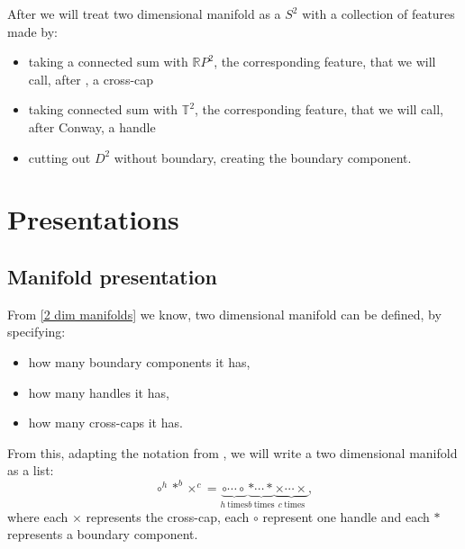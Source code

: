 After \cite{Conway2016} we will treat two dimensional manifold as a $S^2$ with 
a collection of features
made by:
\begin{itemize}
\item taking a connected sum with $\mathbb{R}P^2$, the corresponding feature, that
we will call, after \cite{Conway2016}, a cross-cap
\item taking connected sum with $\mathbb{T}^2$, the corresponding feature, that we will call, 
after Conway, a handle
\item cutting out $D^2$ without boundary, creating the boundary component. 
\end{itemize}






\section{Presentations}\label{therminology and notation}
\subsection{Manifold presentation}
From \ref{2 dim manifolds} we know, two dimensional manifold 
can be 
defined, by specifying:
\begin{itemize}
\item how many boundary components it has,
\item how many handles it has,
\item how many cross-caps it has.
\end{itemize} 
From this, adapting the notation from \cite{Conway2016}, we will write 
a two dimensional manifold as a list: 
\begin{equation}
\circ^h*^b\times^c = \underbrace{\circ\cdots\circ}_{h\ \mathrm{times}} 
\underbrace{*\cdots*}_{b\ \mathrm{times}}\underbrace{\times\cdots \times }_{c\ \mathrm{times}},
\end{equation}
where each $\times$ represents the cross-cap, 
each $\circ$ represent one handle and each $*$ represents a boundary component.

